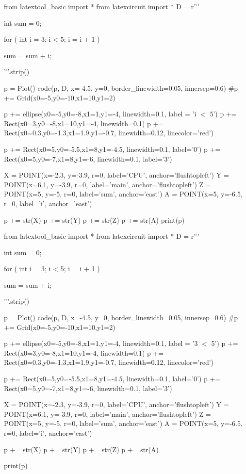 \begin{python}
from latextool_basic import *
from latexcircuit import *
D = r'''



int sum = 0;

    for ( int i = 3;     i < 5;     i = i + 1 )


        sum = sum + i;



'''.strip()

p = Plot()
code(p, D, x=-4.5, y=0, border_linewidth=0.05, innersep=0.6)
#p += Grid(x0=-5,y0=-10,x1=10,y1=2)

p += ellipse(x0=-5,y0=-8,x1=1,y1=-4, linewidth=0.1, label = 'i $<$ 5')
p += Rect(x0=3,y0=-8,x1=10,y1=-4, linewidth=0.1)
p += Rect(x0=0.3,y0=-1.3,x1=1.9,y1=-0.7, linewidth=0.12, linecolor='red')

p += Rect(x0=5,y0=-5.5,x1=8,y1=-4.5, linewidth=0.1, label='0')
p += Rect(x0=5,y0=-7,x1=8,y1=-6, linewidth=0.1, label='3')

X = POINT(x=-2.3, y=-3.9, r=0, label='CPU', anchor='flushtopleft')
Y = POINT(x=6.1, y=-3.9, r=0, label='main', anchor='flushtopleft')
Z = POINT(x=5, y=-5, r=0, label='sum', anchor='east')
A = POINT(x=5, y=-6.5, r=0, label='i', anchor='east')

p += str(X)
p += str(Y)
p += str(Z)
p += str(A)
print(p)
\end{python}

\begin{python}
from latextool_basic import *
from latexcircuit import *
D = r'''



int sum = 0;

    for ( int i = 3;     i < 5;     i = i + 1 )


        sum = sum + i;



'''.strip()

p = Plot()
code(p, D, x=-4.5, y=0, border_linewidth=0.05, innersep=0.6)
#p += Grid(x0=-5,y0=-10,x1=10,y1=2)

p += ellipse(x0=-5,y0=-8,x1=1,y1=-4, linewidth=0.1, label = '3 $<$ 5')
p += Rect(x0=3,y0=-8,x1=10,y1=-4, linewidth=0.1)
p += Rect(x0=0.3,y0=-1.3,x1=1.9,y1=-0.7, linewidth=0.12, linecolor='red')

p += Rect(x0=5,y0=-5.5,x1=8,y1=-4.5, linewidth=0.1, label='0')
p += Rect(x0=5,y0=-7,x1=8,y1=-6, linewidth=0.1, label='3')

X = POINT(x=-2.3, y=-3.9, r=0, label='CPU', anchor='flushtopleft')
Y = POINT(x=6.1, y=-3.9, r=0, label='main', anchor='flushtopleft')
Z = POINT(x=5, y=-5, r=0, label='sum', anchor='east')
A = POINT(x=5, y=-6.5, r=0, label='i', anchor='east')

p += str(X)
p += str(Y)
p += str(Z)
p += str(A)

print(p)
\end{python}


